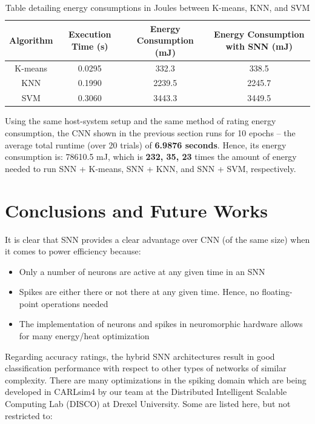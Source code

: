 \documentclass[11pt]{article}  %
\begin{document}
\begin{table}[htbp]
	\begin{center}
		\begin{tabular}{|c|c|c|c|}
			\hline
			\textbf{Algorithm}&\textbf{Execution Time (s)}&\textbf{Energy Consumption (mJ)}&\textbf{Energy Consumption with SNN (mJ)} \\
			\hline
			K-means & 0.0295 & 332.3 & 338.5 \\
			\hline
			KNN & 0.1990 & 2239.5 & 2245.7 \\
			\hline
			SVM & 0.3060 & 3443.3 & 3449.5 \\
			\hline
		\end{tabular}
		\caption{Table detailing energy consumptions in Joules between K-means, KNN, and SVM}
		\label{table2}
	\end{center}
\end{table}


Using the same host-system setup and the same method of rating energy consumption, the CNN shown in the previous section runs for 10 epochs -- the average total runtime (over 20 trials) of \textbf{6.9876 seconds}. Hence, its energy consumption is: 78610.5 mJ, which is \textbf{232, 35, 23} times the amount of energy needed to run SNN + K-means, SNN + KNN, and SNN + SVM, respectively.

\section{Conclusions and Future Works}
\label{future_works}

It is clear that SNN provides a clear advantage over CNN (of the same size) when it comes to power efficiency because:
\begin{itemize}
	\item Only a number of neurons are active at any given time in an SNN
	\item Spikes are either there or not there at any given time. Hence, no floating-point operations needed
	\item The implementation of neurons and spikes in neuromorphic hardware allows for many energy/heat optimization
\end{itemize}

Regarding accuracy ratings, the hybrid SNN architectures result in good classification performance with respect to other types of networks of similar complexity. There are many optimizations in the spiking domain which are being developed in CARLsim4 by our team at the Distributed Intelligent Scalable Computing Lab (DISCO) at Drexel University. Some are listed here, but not restricted to:
\end{document}
